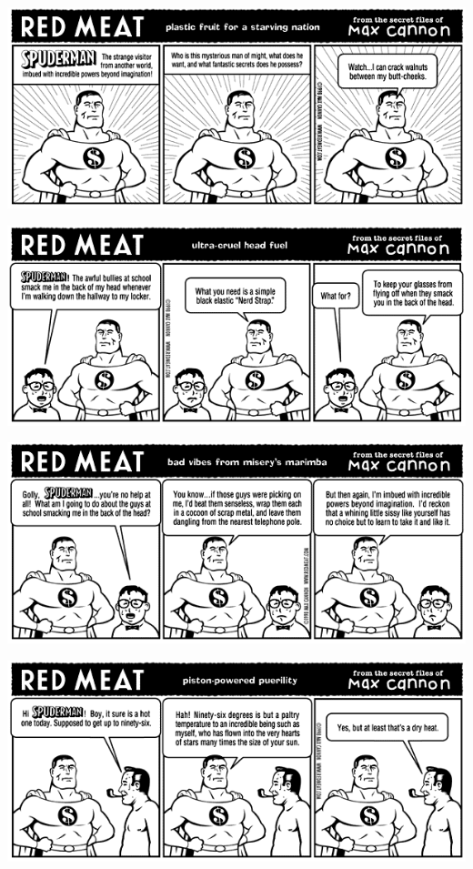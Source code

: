 \documentclass[a4paper,twoside,11pt]{article}
\begin{document}
\includegraphics[width=\textwidth]{redmeat_1998-08-03.png}



\includegraphics[width=\textwidth]{redmeat_1998-08-10.png}



\includegraphics[width=\textwidth]{redmeat_1998-08-17.png}



\includegraphics[width=\textwidth]{redmeat_1998-08-24.png}
\end{document}
